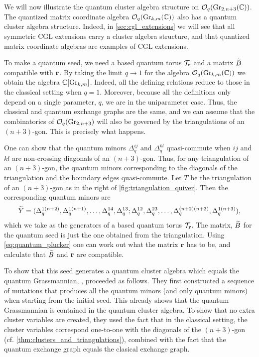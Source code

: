 We will now illustrate the quantum cluster algebra structure on $\mathcal{O}_q(\operatorname{Gr}_{2,
			n+3}(\mathbb{C}))$. The quantized matrix coordinate algebra $\mathcal{O}_q(\operatorname{Gr}_{k, m}(\mathbb{C}))$ also
has a quantum cluster algebra structure. Indeed, in \cref{sec:cgl_extensions} we will
see that all symmetric CGL extensions carry a cluster algebra structure, and that
quantized matrix coordinate algebras are examples of CGL extensions.

\medskip

To make a quantum seed, we need a based quantum torus $\mathcal{T}_{\mathbf{r}}$ and a matrix $\widetilde{B}$
compatible with $\mathbf{r}$. By taking the limit $q\to 1$ for the algebra $\mathcal{O}_q(\operatorname{Gr}_{k,
			m}(\mathbb{C}))$ we obtain the algebra $\mathbb{C}[\operatorname{Gr}_{k,m}]$. Indeed, all the defining relations
reduce to those in the classical setting when $q = 1$. Moreover, because all the
definitions only depend on a single parameter, $q$, we are in the uniparameter case.
Thus, the classical and quantum exchange graphs are the same, and we can assume that
the combinatorics of $\mathcal{O}_q(\operatorname{Gr}_{2, n+3})$ will also be governed by the triangulations
of an $(n+3)$-gon. This is precisely what happens.

One can show that the quantum minors $\Delta_q^{ij}$ and $\Delta_q^{kl}$ quasi-commute
when $ij$ and $kl$ are non-crossing diagonals of an $(n+3)$-gon. Thus, for any
triangulation of an $(n+3)$-gon, the quantum minors corresponding to the diagonals of
the triangulation and the boundary edges quasi-commute. Let $T$ be the triangulation of
an $(n+3)$-gon as in the right of \cref{fig:triangulation_quiver}. Then the
corresponding quantum minors are
\begin{equation*}
	\widetilde{Y} = (\Delta_q^{1(n+2)}, \Delta_q^{1(n+1)}, \dotsc, \Delta_q^{14}, \Delta_q^{13}; \Delta_q^{12}, \Delta_q^{23}, \dotsc, \Delta_q^{(n+2)(n+3)}, \Delta_q^{1(n+3)}),
\end{equation*}
%
which we take as the generators of a based quantum torus $\mathcal{T}_{\mathbf{r}}$. The matrix,
$\widetilde{B}$ for the quantum seed is just the one obtained from the triangulation. Using
\cref{eq:quantum_plucker} one can work out what the matrix $\mathbf{r}$ has to be, and
calculate that $\widetilde{B}$ and $\mathbf{r}$ are compatible.

To show that this seed generates a quantum cluster algebra which equals the quantum
Grassmannian, \textcite{GrabowskiLaunois2011QCAonQuantumGrassmannians}, proceeded as
follows. They first constructed a sequence of mutations that produces all the quantum
minors (and only quantum minors) when starting from the initial seed. This already
shows that the quantum Grassmannian is contained in the quantum cluster algebra. To
show that no extra cluster variables are created, they used the fact that in the
classical setting, the cluster variables correspond one-to-one with the diagonals of
the $(n+3)$-gon (cf. \cref{thm:clusters_and_triangulations}), combined with the fact
that the quantum exchange graph equals the clasical exchange graph.

